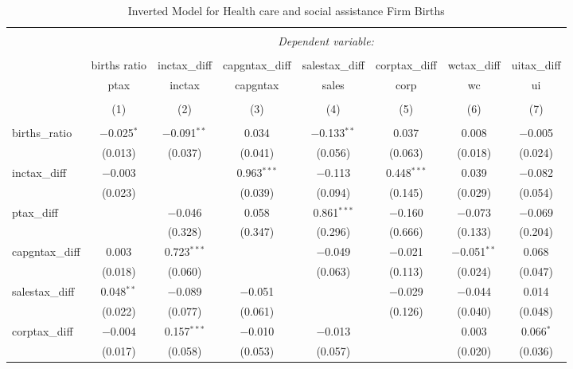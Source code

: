 
\begin{table}[!htbp] \centering 
  \caption{Inverted Model for  Health care and social assistance Firm Births} 
  \label{62rd} 
\footnotesize 
\begin{tabular}{@{\extracolsep{5pt}}lccccccc} 
\\[-1.8ex]\hline 
\hline \\[-1.8ex] 
 & \multicolumn{7}{c}{\textit{Dependent variable:}} \\ 
\cline{2-8} 
\\[-1.8ex] & births ratio & inctax\_diff & capgntax\_diff & salestax\_diff & corptax\_diff & wctax\_diff & uitax\_diff \\ 
 & ptax & inctax & capgntax & sales & corp & wc & ui \\ 
\\[-1.8ex] & (1) & (2) & (3) & (4) & (5) & (6) & (7)\\ 
\hline \\[-1.8ex] 
 births\_ratio & $-$0.025$^{*}$ & $-$0.091$^{**}$ & 0.034 & $-$0.133$^{**}$ & 0.037 & 0.008 & $-$0.005 \\ 
  & (0.013) & (0.037) & (0.041) & (0.056) & (0.063) & (0.018) & (0.024) \\ 
  inctax\_diff & $-$0.003 &  & 0.963$^{***}$ & $-$0.113 & 0.448$^{***}$ & 0.039 & $-$0.082 \\ 
  & (0.023) &  & (0.039) & (0.094) & (0.145) & (0.029) & (0.054) \\ 
  ptax\_diff &  & $-$0.046 & 0.058 & 0.861$^{***}$ & $-$0.160 & $-$0.073 & $-$0.069 \\ 
  &  & (0.328) & (0.347) & (0.296) & (0.666) & (0.133) & (0.204) \\ 
  capgntax\_diff & 0.003 & 0.723$^{***}$ &  & $-$0.049 & $-$0.021 & $-$0.051$^{**}$ & 0.068 \\ 
  & (0.018) & (0.060) &  & (0.063) & (0.113) & (0.024) & (0.047) \\ 
  salestax\_diff & 0.048$^{**}$ & $-$0.089 & $-$0.051 &  & $-$0.029 & $-$0.044 & 0.014 \\ 
  & (0.022) & (0.077) & (0.061) &  & (0.126) & (0.040) & (0.048) \\ 
  corptax\_diff & $-$0.004 & 0.157$^{***}$ & $-$0.010 & $-$0.013 &  & 0.003 & 0.066$^{*}$ \\ 
  & (0.017) & (0.058) & (0.053) & (0.057) &  & (0.020) & (0.036) \\ 

\end{tabular}
\end{table}
